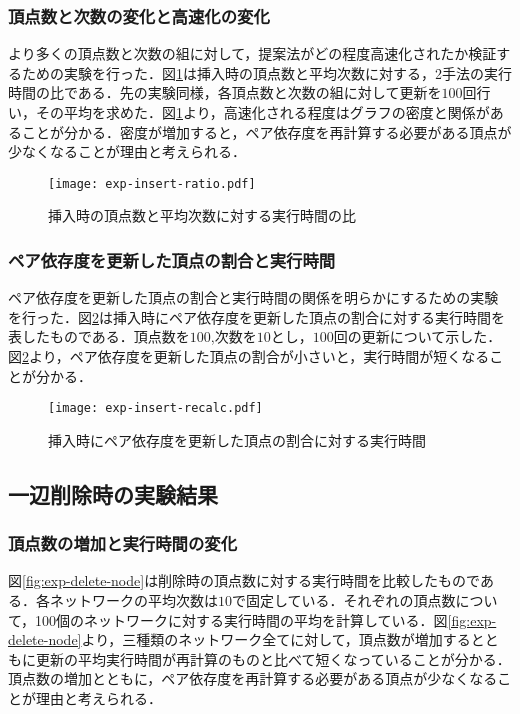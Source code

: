 \subsubsection{頂点数と次数の変化と高速化の変化}
より多くの頂点数と次数の組に対して，提案法がどの程度高速化されたか検証するための実験を行った．図\ref{fig:exp-insert-ratio}は挿入時の頂点数と平均次数に対する，2手法の実行時間の比である．先の実験同様，各頂点数と次数の組に対して更新を$100$回行い，その平均を求めた．図\ref{fig:exp-insert-ratio}より，高速化される程度はグラフの密度と関係があることが分かる．密度が増加すると，ペア依存度を再計算する必要がある頂点が少なくなることが理由と考えられる．

\begin{figure}[tb]
  \centering
  \texttt{[image: exp-insert-ratio.pdf]}
  \caption{挿入時の頂点数と平均次数に対する実行時間の比}
  \label{fig:exp-insert-ratio}
\end{figure}

\subsubsection{ペア依存度を更新した頂点の割合と実行時間}
ペア依存度を更新した頂点の割合と実行時間の関係を明らかにするための実験を行った．図\ref{fig:exp-insert-recalc}は挿入時にペア依存度を更新した頂点の割合に対する実行時間を表したものである．頂点数を$100$,次数を$10$とし，$100$回の更新について示した．図\ref{fig:exp-insert-recalc}より，ペア依存度を更新した頂点の割合が小さいと，実行時間が短くなることが分かる．

\begin{figure}[tb]
  \centering
  \texttt{[image: exp-insert-recalc.pdf]}
  \caption{挿入時にペア依存度を更新した頂点の割合に対する実行時間}
  \label{fig:exp-insert-recalc}
\end{figure}

\subsection{一辺削除時の実験結果}

\subsubsection{頂点数の増加と実行時間の変化}
図\ref{fig:exp-delete-node}は削除時の頂点数に対する実行時間を比較したものである．各ネットワークの平均次数は$10$で固定している．それぞれの頂点数について，100個のネットワークに対する実行時間の平均を計算している．図\ref{fig:exp-delete-node}より，三種類のネットワーク全てに対して，頂点数が増加するとともに更新の平均実行時間が再計算のものと比べて短くなっていることが分かる．頂点数の増加とともに，ペア依存度を再計算する必要がある頂点が少なくなることが理由と考えられる．

